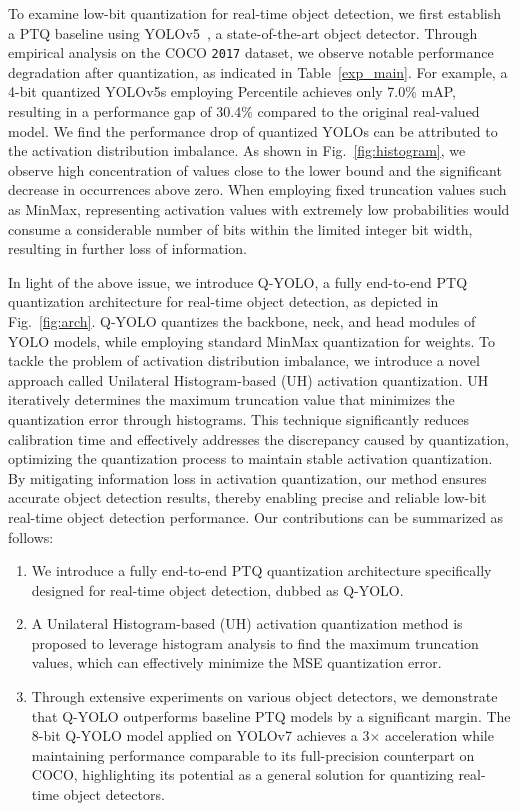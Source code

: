 \documentclass[runningheads]{llncs}
\begin{document}
To examine low-bit quantization for real-time object detection, we first establish a PTQ baseline using YOLOv5~\cite{yolov5}, a state-of-the-art object detector. Through empirical analysis on the COCO {\tt 2017} dataset, we observe notable performance degradation after quantization, as indicated in Table~\ref{exp_main}. For example, a 4-bit quantized YOLOv5s employing Percentile achieves only 7.0\% mAP, resulting in a performance gap of 30.4\% compared to the original real-valued model. We find the performance drop of quantized YOLOs can be attributed to the activation distribution imbalance. As shown in Fig.~\ref{fig:histogram}, we observe high concentration of values close to the lower bound and the significant decrease in occurrences above zero. When employing fixed truncation values such as MinMax, representing activation values with extremely low probabilities would consume a considerable number of bits within the limited integer bit width, resulting in further loss of information.

% 
In light of the above issue, we introduce Q-YOLO, a fully end-to-end PTQ quantization architecture for real-time object detection, as depicted in Fig.~\ref{fig:arch}. Q-YOLO quantizes the backbone, neck, and head modules of YOLO models, while employing standard MinMax quantization for weights. To tackle the problem of activation distribution imbalance, we introduce a novel approach called Unilateral Histogram-based (UH) activation quantization. UH iteratively determines the maximum truncation value that minimizes the quantization error through histograms. This technique significantly reduces calibration time and effectively addresses the discrepancy caused by quantization, optimizing the quantization process to maintain stable activation quantization. By mitigating information loss in activation quantization, our method ensures accurate object detection results, thereby enabling precise and reliable low-bit real-time object detection performance. Our contributions can be summarized as follows:
%
\begin{enumerate}
\item We introduce  a fully end-to-end PTQ quantization architecture specifically designed for real-time object detection, dubbed as Q-YOLO.
\item A Unilateral Histogram-based (UH) activation quantization method is proposed to  leverage  histogram analysis to find the maximum truncation values, which can effectively  minimize the MSE quantization error.
\item Through extensive experiments on various object detectors, we demonstrate that Q-YOLO outperforms baseline PTQ models by a significant margin. The 8-bit Q-YOLO model applied on YOLOv7 achieves a 3$\times$ acceleration while maintaining performance comparable to its full-precision counterpart on COCO, highlighting its potential as a general solution for quantizing real-time object detectors.
\end{enumerate}
\end{document}
